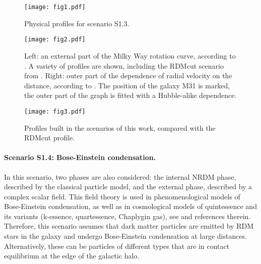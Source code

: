 \documentclass{article}
\begin{document}
\begin{figure}
\begin{center}
\texttt{[image: fig1.pdf]}
\end{center}
\caption{Physical profiles for scenario S1.3.}\label{f1}
\end{figure}

\begin{figure}
\begin{center}
\texttt{[image: fig2.pdf]}
\end{center}
\caption{Left: an external part of the Milky Way rotation curve, according to \cite {1307.8241}. A variety of profiles are shown, including the RDMcut scenario from \cite {bled2020}. Right: outer part of the dependence of radial velocity on the distance, according to \cite {0811.0860}. The position of the galaxy M31 is marked, the outer part of the graph is fitted with a Hubble-alike dependence.}\label{f2}
\end{figure}

\begin{figure}
\begin{center}
\texttt{[image: fig3.pdf]}
\end{center}
\caption{Profiles built in the scenarios of this work, compared with the RDMcut profile.}\label{f3}
\end{figure}

\paragraph*{Scenario S1.4: Bose-Einstein condensation.} In this scenario, two phases are also considered: the internal NRDM phase, described by the classical particle model, and the external phase, described by a complex scalar field. This field theory is used in phenomenological models of Bose-Einstein condensation, as well as in cosmological models of quintessence and its variants (k-essence, quartessence, Chaplygin gas), see \cite {0912.1609} and references therein. Therefore, this scenario assumes that dark matter particles are emitted by RDM stars in the galaxy and undergo Bose-Einstein condensation at large distances. Alternatively, these can be particles of different types that are in contact equilibrium at the edge of the galactic halo.
\end{document}
